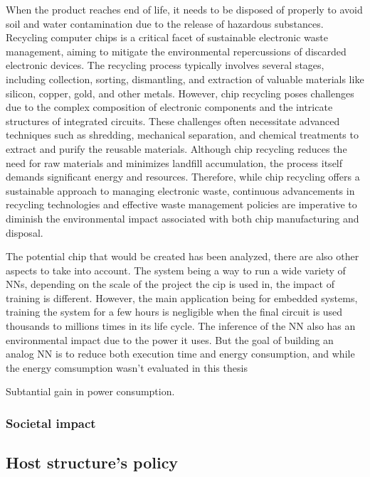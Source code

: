 When the product reaches end of life, it needs to be disposed of properly to avoid soil and water contamination due to the release of hazardous substances. Recycling computer chips is a critical facet of sustainable electronic waste management, aiming to mitigate the environmental repercussions of discarded electronic devices. The recycling process typically involves several stages, including collection, sorting, dismantling, and extraction of valuable materials like silicon, copper, gold, and other metals. However, chip recycling poses challenges due to the complex composition of electronic components and the intricate structures of integrated circuits. These challenges often necessitate advanced techniques such as shredding, mechanical separation, and chemical treatments to extract and purify the reusable materials. Although chip recycling reduces the need for raw materials and minimizes landfill accumulation, the process itself demands significant energy and resources. Therefore, while chip recycling offers a sustainable approach to managing electronic waste, continuous advancements in recycling technologies and effective waste management policies are imperative to diminish the environmental impact associated with both chip manufacturing and disposal.

The potential chip that would be created has been analyzed, there are also other aspects to take into account. The system being a way to run a wide variety of \acp{NN}, depending on the scale of the project the cip is used in, the impact of training is different. However, the main application being for embedded systems, training the system for a few hours is negligible when the final circuit is used thousands to millions times in its life cycle.
The inference of the \ac{NN} also has an environmental impact due to the power it uses. But the goal of building an analog \ac{NN} is to reduce both execution time and energy consumption, and while the energy comsumption wasn't evaluated in this thesis

Subtantial gain in power consumption.

\subsubsection{Societal impact}

\subsection{Host structure's policy}
